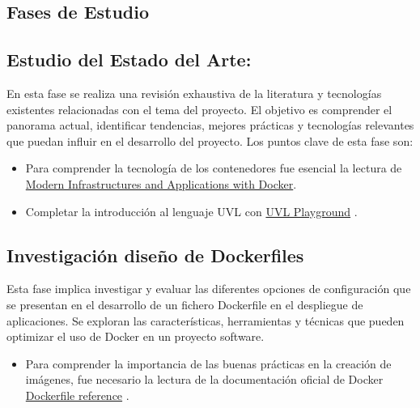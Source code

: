 \documentclass[12pt, a4paper, twoside]{article}
\begin{document}
\subsection{Fases de Estudio}

\subsection{Estudio del Estado del Arte:}
En esta fase se realiza una revisión exhaustiva de la literatura y tecnologías existentes relacionadas con el tema del 
proyecto. El objetivo es comprender el panorama actual, identificar tendencias, mejores prácticas y tecnologías 
relevantes que puedan influir en el desarrollo del proyecto. Los puntos clave de esta fase son:

\begin{itemize}
	\item Para comprender la tecnología de los contenedores fue esencial la lectura de \href{https://www.oreilly.com/library/view/docker-certified-associate/9781839211898/c5ecd7bc-b7ed-4303-89a8-e487c6a220ed.xhtml#uuid-1a5da664-fb76-4e56-bdb0-83255dde9e78}{Modern Infrastructures and Applications with Docker}. \cite{docker_certified_associate}
	\item Completar la introducción al lenguaje UVL con \href{https://uvl.uni-ulm.de/}{UVL Playground} \cite{uvl_playground}.
\end{itemize}

\subsection{Investigación diseño de Dockerfiles}
Esta fase implica investigar y evaluar las diferentes opciones de configuración que se presentan en el desarrollo de un fichero Dockerfile en el 
despliegue de aplicaciones. Se exploran las características, herramientas y técnicas que pueden optimizar el uso de 
Docker en un proyecto software. 

\begin{itemize}
	\item Para comprender la importancia de las buenas prácticas en la creación de imágenes, fue necesario la lectura de la documentación oficial de Docker \href{https://docs.docker.com/reference/Dockerfile/}{Dockerfile reference} \cite{Dockerfile_reference}.
\end{itemize}
\end{document}
